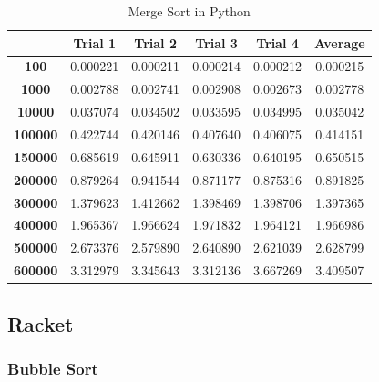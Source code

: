 \documentclass[]{report}
\begin{document}
				\begin{table}[H]  
  				  \centering
  				  \caption{Merge Sort in Python}
		 		  \begin{tabular}{cccccc}
		 		    \toprule
		 		         & \textbf{Trial 1} & \textbf{Trial 2} & \textbf{Trial 3} & \textbf{Trial 4} & \textbf{Average} \\ \midrule
		 		    \textbf{100} 	& 0.000221 & 0.000211 & 0.000214 & 0.000212 & 0.000215   \\
		 		    \textbf{1000} 	& 0.002788 & 0.002741 & 0.002908 & 0.002673 & 0.002778   \\
		 		    \textbf{10000} 	& 0.037074 & 0.034502 & 0.033595 & 0.034995 & 0.035042   \\
		 		    \textbf{100000} & 0.422744 & 0.420146 & 0.407640 & 0.406075 & 0.414151   \\
		 		    \textbf{150000} & 0.685619 & 0.645911 & 0.630336 & 0.640195 & 0.650515   \\
		 		    \textbf{200000} & 0.879264 & 0.941544 & 0.871177 & 0.875316 & 0.891825   \\
		 		    \textbf{300000} & 1.379623 & 1.412662 & 1.398469 & 1.398706 & 1.397365   \\
		 		    \textbf{400000} & 1.965367 & 1.966624 & 1.971832 & 1.964121 & 1.966986   \\
		 		    \textbf{500000} & 2.673376 & 2.579890 & 2.640890 & 2.621039 & 2.628799   \\
		 		    \textbf{600000} & 3.312979 & 3.345643 & 3.312136 & 3.667269 & 3.409507   \\ \bottomrule
		 		  \end{tabular}
		 		\end{table}
		 		
		 		
		    \subsection{Racket}
		 		\subsubsection{Bubble Sort}
		 		
\end{document}
